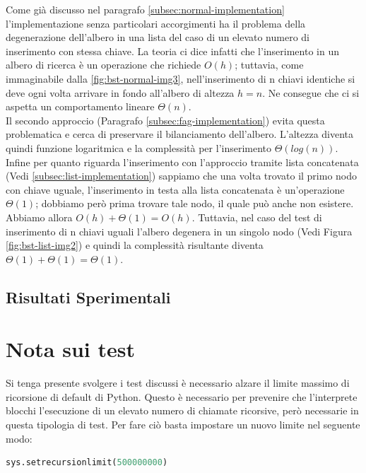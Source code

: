 \documentclass{article}
\begin{document}
Come già discusso nel paragrafo \ref{subsec:normal-implementation} l'implementazione senza particolari accorgimenti ha il problema della degenerazione dell'albero in una lista del caso di un elevato numero di inserimento con stessa chiave.
La teoria ci dice infatti che l'inserimento in un albero di ricerca è un operazione che richiede $O(h)$; tuttavia, come immaginabile dalla \cref{fig:bst-normal-img3}, nell'inserimento di n chiavi identiche si deve ogni volta arrivare in fondo all'albero di altezza $h=n$. Ne consegue che ci si aspetta un comportamento lineare $\Theta(n)$.
\\
Il secondo approccio (Paragrafo \ref{subsec:fag-implementation}) evita questa problematica e cerca di preservare il bilanciamento dell'albero. L'altezza diventa quindi funzione logaritmica e la complessità  per l'inserimento $\Theta(log(n))$.
\\
Infine per quanto riguarda l'inserimento con l'approccio tramite lista concatenata (Vedi \ref{subsec:list-implementation}) sappiamo che una volta trovato il primo nodo con chiave uguale, l'inserimento in testa alla lista concatenata è un'operazione $\Theta(1)$; dobbiamo però prima trovare tale nodo, il quale può anche non esistere. Abbiamo allora $O(h) + \Theta(1) = O(h)$. 
Tuttavia, nel caso del test di inserimento di n chiavi uguali l'albero degenera in un singolo nodo (Vedi Figura \ref{fig:bst-list-img2}) e quindi la complessità risultante diventa $\Theta(1) + \Theta(1) = \Theta(1)$.





\subsection{Risultati Sperimentali}











\newpage

\section*{Nota sui test}


Si tenga presente svolgere i test discussi è necessario alzare il limite massimo di ricorsione di default di Python. Questo è necessario per prevenire che l'interprete blocchi l'esecuzione di un elevato numero di chiamate ricorsive, però necessarie in questa tipologia di test.
Per fare ciò basta impostare un nuovo limite nel seguente modo:
\begin{lstlisting}[language=Python]
sys.setrecursionlimit(500000000)
\end{lstlisting}
\end{document}
